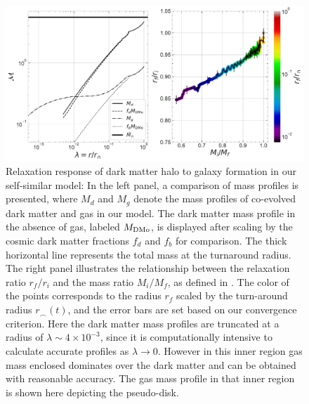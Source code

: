 \begin{figure}[htbp]
\centering
\includegraphics[width=0.99\linewidth,trim={0 0cm 0cm 0},clip]{plots/relx_reln_ref.pdf}
\caption{Relaxation response of dark matter halo to galaxy formation in our self-similar model: In the left panel, a comparison of mass profiles is presented, where $M_d$ and $M_g$ denote the mass profiles of co-evolved dark matter and gas in our model. The dark matter mass profile in the absence of gas, labeled $M_{\rm DMo}$, is displayed after scaling by the cosmic dark matter fractions $f_d$ and $f_b$ for comparison. The thick horizontal line represents the total mass at the turnaround radius. The right panel illustrates the relationship between the relaxation ratio $r_f/r_i$ and the mass ratio $M_i/M_f$, as defined in . The color of the points corresponds to the radius $r_f$ scaled by the turn-around radius $r_{\smallfrown}(t)$,  and the error bars are set based on our convergence criterion. Here the dark matter mass profiles are truncated at a radius of $\lambda\sim 4 \times 10^{-3}$, since it is computationally intensive to calculate accurate profiles as $\lambda \rightarrow 0$. However in this inner region gas mass enclosed dominates over the dark matter and can be obtained with reasonable accuracy. The gas mass profile in that inner region is shown here depicting the pseudo-disk.}%
\label{fig:relx_reln-ch:ssr}
\end{figure}

